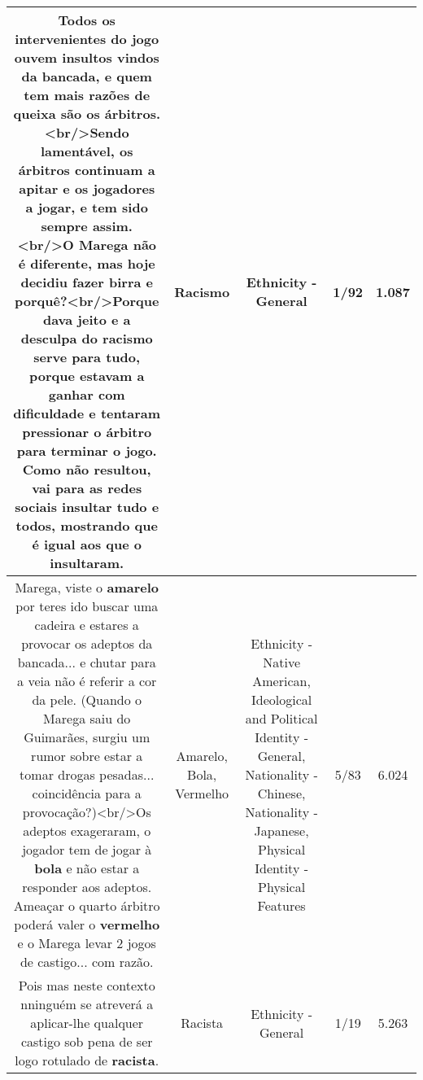 \documentclass[11pt]{article}
\newlength\mylength
\begin{document}
\begin{center}
\begin{longtable}{|C{.65\mylength}|C{.30\mylength}|C{.12\mylength}|C{.12\mylength}|C{.12\mylength}|}
  \small Todos os intervenientes do jogo ouvem insultos vindos da bancada, e quem tem mais razões de queixa são os árbitros.<br/>Sendo lamentável, os árbitros continuam a apitar e os jogadores a jogar, e tem sido sempre assim.<br/>O Marega não é diferente, mas hoje decidiu fazer birra e porquê?<br/>Porque dava jeito e a desculpa do \textbf{racismo} serve para tudo, porque estavam a ganhar com dificuldade e tentaram pressionar o árbitro para terminar o jogo. Como não resultou, vai para as redes sociais insultar tudo e todos, mostrando que é igual aos que o insultaram.\normalsize   & Racismo & Ethnicity - General & 1/92 & 1.087 \\  \hline
  \small Marega, viste o \textbf{a\textbf{marelo}} por teres ido buscar uma cadeira e estares a provocar os adeptos da bancada... e chutar para a veia não é referir a cor da pele. (Quando o Marega saiu do Guimarães, surgiu um rumor sobre estar a tomar drogas pesadas... coincidência para a provocação?)<br/>Os adeptos exageraram, o jogador tem de jogar à \textbf{bola} e não estar a responder aos adeptos. Ameaçar o quarto árbitro poderá valer o \textbf{v\textbf{ermelho}} e o Marega levar 2 jogos de castigo... com razão.\normalsize   & Amarelo, Bola, Vermelho & Ethnicity - Native American, Ideological and Political Identity - General, Nationality - Chinese, Nationality - Japanese, Physical Identity - Physical Features & 5/83 & 6.024 \\  \hline
  \small Pois mas neste contexto nninguém se atreverá a aplicar-lhe qualquer castigo sob pena de ser logo rotulado de \textbf{racista}.\normalsize   & Racista & Ethnicity - General & 1/19 & 5.263 \\  \hline
  
\end{longtable}
\end{center}
\end{document}
